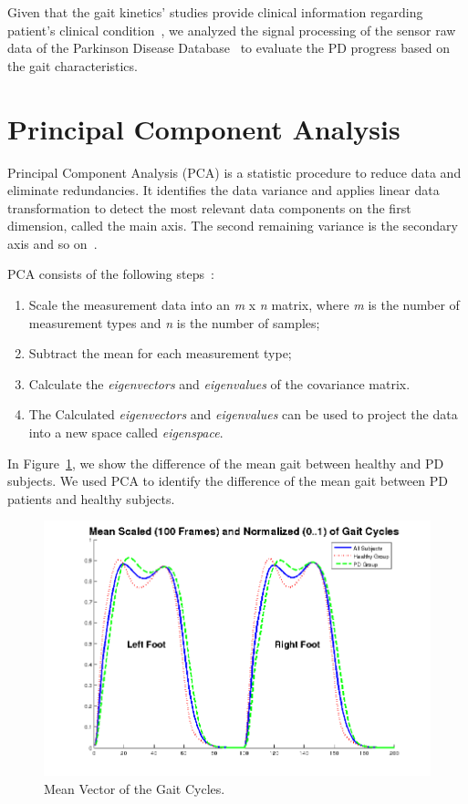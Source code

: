 \documentclass[10pt, conference, compsocconf]{IEEEtran}
\begin{document}
Given that the gait kinetics' studies provide clinical information regarding patient's clinical condition~\cite{gaitusingsensorsreview2012}, we analyzed the signal processing of the sensor raw data of the Parkinson Disease Database~\cite{physionet} to evaluate the PD progress based on the gait characteristics. 

\section{Principal Component Analysis}\label{sec:pca}

Principal Component Analysis (PCA) is a statistic procedure to reduce data and eliminate redundancies. It identifies the data variance and applies linear data transformation to detect the most relevant data components on the first dimension, called the main axis.  The second remaining variance is the secondary axis and so on~\cite{pcarotor2014}.

PCA consists of the following steps~\cite{Shlens05atutorial}: 
\begin{enumerate}
 \item Scale the measurement data into an \textit{m} x \textit{n} matrix, where \textit{m} is the number of measurement types and \textit{n} is the number of samples;
 \item Subtract the mean for each measurement type;
 \item Calculate the \textit{eigenvectors} and \textit{eigenvalues} of the covariance matrix.
 \item The Calculated \textit{eigenvectors} and \textit{eigenvalues} can be used to project the data into a new space called \textit{eigenspace}.
\end{enumerate}


In Figure~\ref{fig:diferencemean}, we show the difference of the mean gait between healthy and PD subjects. We used PCA to identify the difference of the mean gait between PD patients and healthy subjects.

\begin{figure}[!h]
\centering	
\includegraphics[width=.52\textwidth]{img/meangait.png}
\caption{Mean Vector of the Gait Cycles.}
\label{fig:diferencemean}
\end{figure}
\end{document}
